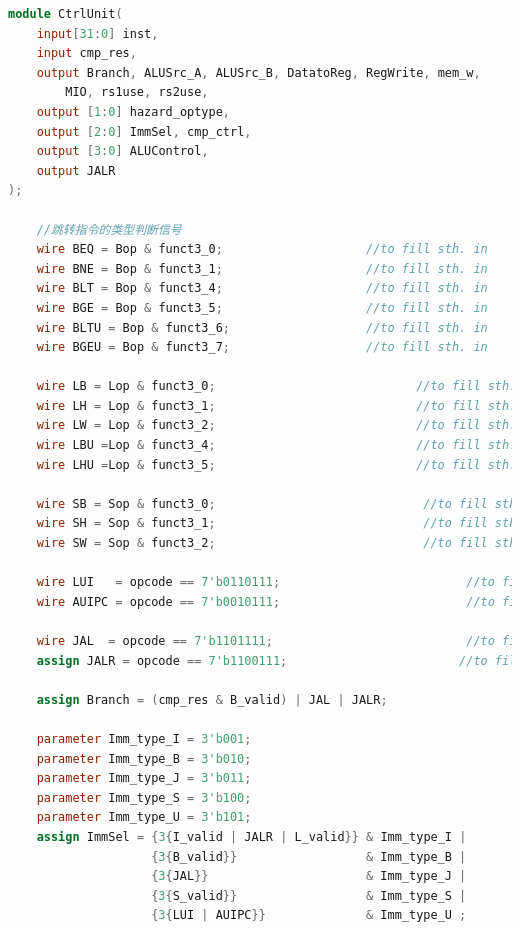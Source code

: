 \begin{lstlisting}[language = {verilog}]
module CtrlUnit(
    input[31:0] inst,
    input cmp_res,
    output Branch, ALUSrc_A, ALUSrc_B, DatatoReg, RegWrite, mem_w,
        MIO, rs1use, rs2use,
    output [1:0] hazard_optype,
    output [2:0] ImmSel, cmp_ctrl,
    output [3:0] ALUControl,
    output JALR
);

    //跳转指令的类型判断信号
    wire BEQ = Bop & funct3_0;                    //to fill sth. in 
    wire BNE = Bop & funct3_1;                    //to fill sth. in 
    wire BLT = Bop & funct3_4;                    //to fill sth. in 
    wire BGE = Bop & funct3_5;                    //to fill sth. in 
    wire BLTU = Bop & funct3_6;                   //to fill sth. in 
    wire BGEU = Bop & funct3_7;                   //to fill sth. in 

    wire LB = Lop & funct3_0;                            //to fill sth. in 
    wire LH = Lop & funct3_1;                            //to fill sth. in 
    wire LW = Lop & funct3_2;                            //to fill sth. in 
    wire LBU =Lop & funct3_4;                            //to fill sth. in 
    wire LHU =Lop & funct3_5;                            //to fill sth. in 

    wire SB = Sop & funct3_0;                             //to fill sth. in 
    wire SH = Sop & funct3_1;                             //to fill sth. in 
    wire SW = Sop & funct3_2;                             //to fill sth. in 

    wire LUI   = opcode == 7'b0110111;                          //to fill sth. in 
    wire AUIPC = opcode == 7'b0010111;                          //to fill sth. in 

    wire JAL  = opcode == 7'b1101111;                           //to fill sth. in 
    assign JALR = opcode == 7'b1100111;                        //to fill sth. in 

    assign Branch = (cmp_res & B_valid) | JAL | JALR;                       //to fill sth. in 

    parameter Imm_type_I = 3'b001;
    parameter Imm_type_B = 3'b010;
    parameter Imm_type_J = 3'b011;
    parameter Imm_type_S = 3'b100;
    parameter Imm_type_U = 3'b101;
    assign ImmSel = {3{I_valid | JALR | L_valid}} & Imm_type_I |
                    {3{B_valid}}                  & Imm_type_B |
                    {3{JAL}}                      & Imm_type_J |
                    {3{S_valid}}                  & Imm_type_S |
                    {3{LUI | AUIPC}}              & Imm_type_U ;



\end{lstlisting}
